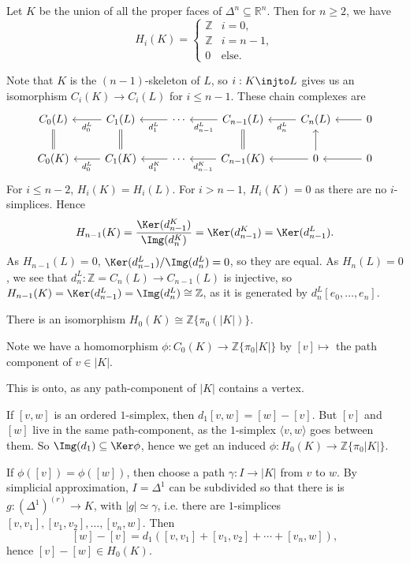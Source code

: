 \documentclass[12pt]{article}
\begin{document}
\begin{corollary}
	Let $K$ be the union of all the proper faces of $\Delta^n \subseteq \mathbb{R}^n$. Then for $n \geq 2$, we have
	\[
		H_i(K) =
		\begin{cases}
			\mathbb{Z} & i = 0, \\
			\mathbb{Z} & i = n-1, \\
			0 & \text{else}.
		\end{cases}
	\]
\end{corollary}

\begin{proofbox}
	Note that $K$ is the $(n-1)$-skeleton of $L$, so $i : K \injto L$ gives us an isomorphism $C_i(K) \to C_i(L)$ for $i \leq n-1$. These chain complexes are
	\[
	\begin{tikzcd}
		C_0(L) & C_1(L) \arrow[l, "d_0^L"] & \cdots \arrow[l, "d_1^L"] & C_{n-1}(L) \arrow[l, "d_{n-1}^L"] & C_n(L) \arrow[l, "d_n^L"] & 0 \arrow[l] \\
		C_0(K) \arrow[u, equal] & C_1(K) \arrow[l, "d_0^L"] \arrow[u, equal] & \cdots \arrow[l, "d_1^K"] & C_{n-1}(K) \arrow[l, "d_{n-1}^K"] \arrow[u, equal] & 0 \arrow[l] \arrow[u] & 0 \arrow[l]
	\end{tikzcd}
	\]
	For $i \leq n-2$, $H_i(K) = H_i(L)$. For $i > n-1$, $H_i(K) = 0$ as there are no $i$-simplices. Hence
	\[
	H_{n-1}(K) = \frac{\Ker(d_{n-1}^K)}{\Img(d_n^K)} = \Ker(d_{n-1}^K) = \Ker(d_{n-1}^L).
	\]
	As $H_{n-1}(L) = 0$, $\Ker(d_{n-1}^L)/\Img(d_{n}^L) = 0$, so they are equal. As $H_n(L) = 0$, we see that $d_n^L : \mathbb{Z} = C_n(L) \to C_{n-1}(L)$ is injective, so $H_{n-1}(K) = \Ker(d_{n-1}^L) = \Img(d_n^L) \cong \mathbb{Z}$, as it is generated by $d_n^L [e_0, \ldots, e_n]$.
\end{proofbox}

\begin{lemma}
	There is an isomorphism $H_0(K) \cong \mathbb{Z}\{\pi_0(|K|)\}$.
\end{lemma}


\begin{proofbox}
	Note we have a homomorphism $\phi : C_0(K) \to \mathbb{Z}\{\pi_0|K|\}$ by $[v] \mapsto$ the path component of $v \in |K|$.

	This is onto, as any path-component of $|K|$ contains a vertex.

	If $[v, w]$ is an ordered $1$-simplex, then $d_1[v, w] = [w] - [v]$. But $[v]$ and $[w]$ live in the same path-component, as the $1$-simplex $\langle v, w \rangle$ goes between them. So $\Img(d_1) \subseteq \Ker \phi$, hence we get an induced $\phi : H_0(K) \to \mathbb{Z}\{\pi_0|K|\}$.

	If $\phi([v]) = \phi([w])$, then choose a path $\gamma : I \to |K|$ from $v$ to $w$. By simplicial approximation, $I = \Delta^1$ can be subdivided so that there is is $g : (\Delta^1)^{(r)} \to K$, with $|g| \simeq \gamma$, i.e. there are $1$-simplices $[v, v_1], [v_1, v_2], \ldots, [v_n, w]$. Then
	\[
		[w] - [v] = d_1([v, v_1] + [v_1, v_2] + \cdots + [v_n, w]),
	\]
	hence $[v] - [w] \in H_0(K)$.
\end{proofbox}
\end{document}
